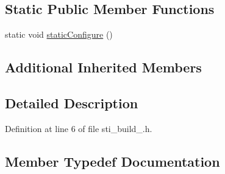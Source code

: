 \subsection*{Static Public Member Functions}
\begin{DoxyCompactItemize}
\item 
static void \hyperlink{structsm__starcraft__ai_1_1build__inner__states_1_1StiBuild3_a20b4866fcfb1434d4cf862a5f511bbf8}{static\+Configure} ()
\end{DoxyCompactItemize}
\subsection*{Additional Inherited Members}


\subsection{Detailed Description}


Definition at line 6 of file sti\+\_\+build\+\_.\+h.



\subsection{Member Typedef Documentation}
\mbox{\label{structsm__starcraft__ai_1_1build__inner__states_1_1StiBuild3_a2b857ab01ffed639b605c5931f610676}} 
